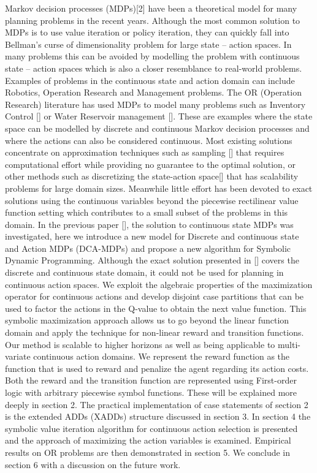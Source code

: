 \documentclass[letterpaper]{article}
\renewcommand{\-}{\text{-}}
\begin{document}
Markov decision processes (MDPs)[2] have been a theoretical model for many planning problems in the recent years. Although the most common solution to MDPs is to use value iteration or policy iteration, they can quickly fall into Bellman's curse of dimensionality problem for large state – action spaces. In many problems this can be avoided by modelling the problem with continuous state – action spaces which is also a closer resemblance to real-world problems. \\
Examples of problems in the continuous state and action domain can include Robotics, Operation Research and Management problems. The OR (Operation Research) literature has used MDPs to model many problems such as Inventory Control [] or Water Reservoir management []. These are examples where the state space can be modelled by discrete and continuous Markov decision processes and where the actions can also be considered continuous. Most existing solutions concentrate on approximation techniques such as sampling [] that requires computational effort while providing no guarantee to the optimal solution, or other methods such as discretizing the state-action space[] that has scalability problems for large domain sizes. Meanwhile little effort has been devoted to exact solutions using the continuous variables beyond the piecewise rectilinear value function setting which contributes to a small subset of the problems in this domain. 
In the previous paper [], the solution to continuous state MDPs was investigated, here we introduce a new model for Discrete and continuous state and Action MDPs (DCA-MDPs) and propose a new algorithm for Symbolic Dynamic Programming. Although the exact solution presented in [] covers the discrete and continuous state domain, it could not be used for planning in continuous action spaces. We exploit the algebraic properties of the maximization operator for continuous actions and develop disjoint case partitions that can be used to factor the actions in the Q-value to obtain the next value function. This symbolic maximization approach allows us to go beyond the linear function domain and apply the technique for non-linear reward and transition functions. Our method is scalable to higher horizons as well as being applicable to multi-variate continuous action domains. We represent the reward function as the function that is used to reward and penalize the agent regarding its action costs. Both the reward and the transition function are represented using First-order logic with arbitrary piecewise symbol functions. These will be explained more deeply in section 2. 
The practical implementation of case statements of section 2 is the extended ADDs (XADDs) structure discussed in section 3. In section 4 the symbolic value iteration algorithm for continuous action selection is presented and the approach of maximizing the action variables is examined. Empirical results on OR problems are then demonstrated in section 5. We conclude in section 6 with a discussion on the future work. 
\end{document}

